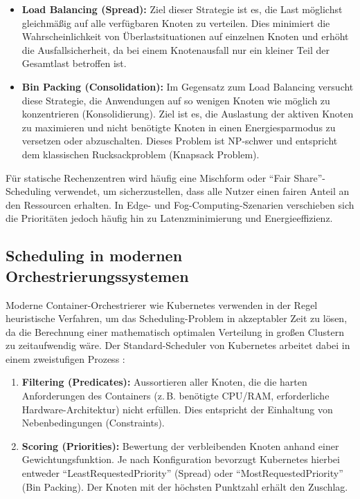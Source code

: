 \begin{itemize}
    \item \textbf{Load Balancing (Spread):} Ziel dieser Strategie ist es, die Last möglichst gleichmäßig auf alle verfügbaren Knoten zu verteilen. Dies minimiert die Wahrscheinlichkeit von Überlastsituationen auf einzelnen Knoten und erhöht die Ausfallsicherheit, da bei einem Knotenausfall nur ein kleiner Teil der Gesamtlast betroffen ist.
    \item \textbf{Bin Packing (Consolidation):} Im Gegensatz zum Load Balancing versucht diese Strategie, die Anwendungen auf so wenigen Knoten wie möglich zu konzentrieren (Konsolidierung). Ziel ist es, die Auslastung der aktiven Knoten zu maximieren und nicht benötigte Knoten in einen Energiesparmodus zu versetzen oder abzuschalten. Dieses Problem ist NP-schwer und entspricht dem klassischen Rucksackproblem (Knapsack Problem). \cite{Garey1979}
\end{itemize}

Für statische Rechenzentren wird häufig eine Mischform oder \enquote{Fair Share}-Scheduling verwendet, um sicherzustellen, dass alle Nutzer einen fairen Anteil an den Ressourcen erhalten. In Edge- und Fog-Computing-Szenarien verschieben sich die Prioritäten jedoch häufig hin zu Latenzminimierung und Energieeffizienz.

\subsection{Scheduling in modernen Orchestrierungssystemen}
Moderne Container-Orchestrierer wie Kubernetes verwenden in der Regel heuristische Verfahren, um das Scheduling-Problem in akzeptabler Zeit zu lösen, da die Berechnung einer mathematisch optimalen Verteilung in großen Clustern zu zeitaufwendig wäre. Der Standard-Scheduler von Kubernetes arbeitet dabei in einem zweistufigen Prozess \cite{Bernstein2014}:

\begin{enumerate}
    \item \textbf{Filtering (Predicates):} Aussortieren aller Knoten, die die harten Anforderungen des Containers (z.\,B. benötigte CPU/RAM, erforderliche Hardware-Architektur) nicht erfüllen. Dies entspricht der Einhaltung von Nebenbedingungen (Constraints).
    \item \textbf{Scoring (Priorities):} Bewertung der verbleibenden Knoten anhand einer Gewichtungsfunktion. Je nach Konfiguration bevorzugt Kubernetes hierbei entweder \enquote{LeastRequestedPriority} (Spread) oder \enquote{MostRequestedPriority} (Bin Packing). Der Knoten mit der höchsten Punktzahl erhält den Zuschlag.
\end{enumerate}

